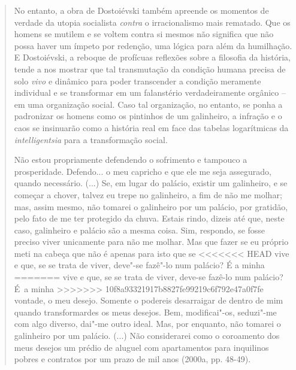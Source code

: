 {\begin{quote}
No entanto, a obra de Dostoiévski também apreende os momentos de verdade
da utopia socialista \emph{contra} o irracionalismo mais rematado. Que
os homens se mutilem e se voltem contra si mesmos não significa que não
possa haver um ímpeto por redenção, uma lógica para além da humilhação.
E Dostoiévski, a reboque de profícuas reflexões sobre a filosofia da
história, tende a nos mostrar que tal transmutação da condição humana
precisa de solo \emph{vivo} e dinâmico para poder transcender a condição
meramente individual e se transformar em um falanstério verdadeiramente
orgânico -- em uma organização social. Caso tal organização, no entanto,
se ponha a padronizar os homens como os pintinhos de um galinheiro, a
infração e o caos se insinuarão como a história real em face das tabelas
logarítmicas da \emph{intelligentsia} para a transformação social.

Não estou propriamente defendendo o sofrimento e tampouco a
prosperidade. Defendo... o meu capricho e que ele me seja assegurado,
quando necessário. (...) Se, em lugar do palácio, existir um galinheiro,
e se começar a chover, talvez eu trepe no galinheiro, a fim de não me
molhar; mas, assim mesmo, não tomarei o galinheiro por um palácio, por
gratidão, pelo fato de me ter protegido da chuva. Estais rindo, dizeis
até que, neste caso, galinheiro e palácio são a mesma coisa. Sim,
respondo, se fosse preciso viver unicamente para não me molhar. Mas que
fazer se eu próprio meti na cabeça que não é apenas para isto que se
<<<<<<< HEAD
vive e que, se se trata de viver, deve"-se fazê"-lo num palácio? É a minha
=======
vive e que, se se trata de viver, deve-se fazê-lo num palácio? É~a minha
>>>>>>> 10f8a93321917b8827fe99219c6f792e47a0f7fe
vontade, o meu desejo. Somente o podereis desarraigar de dentro de mim
quando transformardes os meus desejos. Bem, modificai"-os, seduzi"-me com
algo diverso, dai"-me outro ideal. Mas, por enquanto, não tomarei o
galinheiro por um palácio. (...) Não considerarei como o coroamento dos
meus desejos um prédio de aluguel com apartamentos para inquilinos
pobres e contratos por um prazo de mil anos (2000a, pp. 48-49).


\end{quote}}
